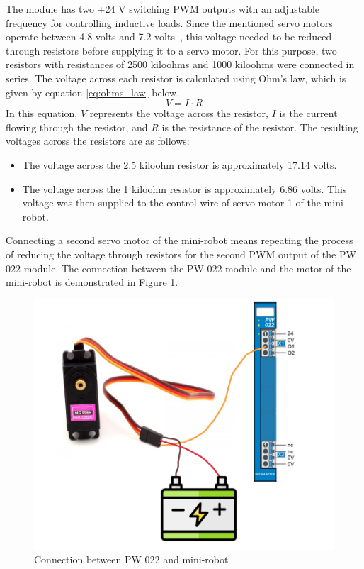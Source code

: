 \documentclass[MMR,Master,english]{twbook}
\begin{document}
\noindent The module has two +24 V switching PWM outputs with an adjustable frequency for controlling inductive loads. Since the mentioned servo motors operate between 4.8 volts and 7.2 volts~\cite{MG996RServoMotor}, this voltage needed to be reduced through resistors before supplying it to a servo motor. For this purpose, two resistors with resistances of 2500 kiloohms and 1000 kiloohms were connected in series. The voltage across each resistor is calculated using Ohm's law, which is given by equation \ref{eq:ohms_law} below.
\begin{equation}
	\label{eq:ohms_law}
	V = I \cdot R
\end{equation}	
In this equation, \(V\) represents the voltage across the resistor, \(I\) is the current flowing through the resistor, and \(R\) is the resistance of the resistor. The resulting voltages across the resistors are as follows:
\begin{itemize}
\item The voltage across the 2.5 kiloohm resistor is approximately 17.14 volts.
\item The voltage across the 1 kiloohm resistor is approximately 6.86 volts. This voltage was then supplied to the control wire of servo motor 1 of the mini-robot.
\end{itemize}

\noindent Connecting a second servo motor of the mini-robot means repeating the process of reducing the voltage through resistors for the second PWM output of the PW 022 module. The connection between the PW 022 module and the motor of the mini-robot is demonstrated in Figure \ref{fig:pw022_minirobot_connection}.

\begin{figure}[H]
	\centering
	\includegraphics[width=0.7\columnwidth]{img/experiment/pw022_minirobot.png}
	\caption[Connection between PW 022 and mini-robot]{Connection between PW 022 and mini-robot~\cite{MG996RDigitalServo}}
	\label{fig:pw022_minirobot_connection}
\end{figure}
\end{document}
